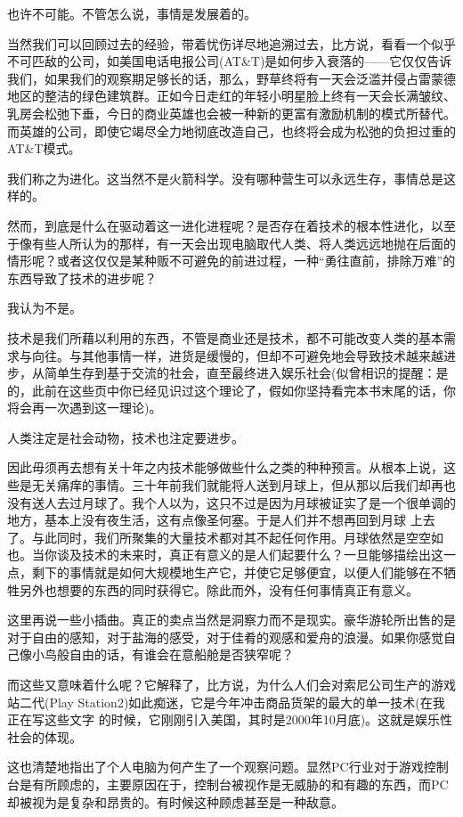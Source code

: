 也许不可能。不管怎么说，事情是发展着的。

当然我们可以回顾过去的经验，带着忧伤详尽地追溯过去，比方说，看看一个似乎不可匹敌的公司，如美国电话电报公司(AT\&T)是如何步入衰落的——它仅仅告诉我们，如果我们的观察期足够长的话，那么，野草终将有一天会泛滥并侵占雷蒙德地区的整洁的绿色建筑群。正如今日走红的年轻小明星脸上终有一天会长满皱纹、乳房会松弛下垂，今日的商业英雄也会被一种新的更富有激励机制的模式所替代。而英雄的公司，即使它竭尽全力地彻底改造自己，也终将会成为松弛的负担过重的AT\&T模式。

我们称之为进化。这当然不是火箭科学。没有哪种营生可以永远生存，事情总是这样的。

然而，到底是什么在驱动着这一进化进程呢？是否存在着技术的根本性进化，以至于像有些人所认为的那样，有一天会出现电脑取代人类、将人类远远地抛在后面的情形呢？或者这仅仅是某种贩不可避免的前进过程，一种“勇往直前，排除万难”的东西导致了技术的进步呢？

我认为不是。

技术是我们所藉以利用的东西，不管是商业还是技术，都不可能改变人类的基本需求与向往。与其他事情一样，进货是缓慢的，但却不可避免地会导致技术越来越进步，从简单生存到基于交流的社会，直至最终进入娱乐社会(似曾相识的提醒：是的，此前在这些页中你已经见识过这个理论了，假如你坚持看完本书末尾的话，你将会再一次遇到这一理论)。

人类注定是社会动物，技术也注定要进步。

因此毋须再去想有关十年之内技术能够做些什么之类的种种预言。从根本上说，这些是无关痛痒的事情。三十年前我们就能将人送到月球上，但从那以后我们却再也没有送人去过月球了。我个人以为，这只不过是因为月球被证实了是一个很单调的地方，基本上没有夜生活，这有点像圣何塞。于是人们并不想再回到月球 上去了。与此同时，我们所聚集的大量技术都对其不起任何作用。月球依然是空空如也。当你谈及技术的未来时，真正有意义的是人们起要什么？一旦能够描绘出这一点，剩下的事情就是如何大规模地生产它，并使它足够便宜，以便人们能够在不牺牲另外也想要的东西的同时获得它。除此而外，没有任何事情真正有意义。

这里再说一些小插曲。真正的卖点当然是洞察力而不是现实。豪华游轮所出售的是对于自由的感知，对于盐海的感受，对于佳肴的观感和爱舟的浪漫。如果你感觉自己像小鸟般自由的话，有谁会在意船舱是否狭窄呢？

而这些又意味着什么呢？它解释了，比方说，为什么人们会对索尼公司生产的游戏站二代(Play Station2)如此痴迷，它是今年冲击商品货架的最大的单一技术(在我正在写这些文字 的时候，它刚刚引入美国，其时是2000年10月底)。这就是娱乐性社会的体现。

这也清楚地指出了个人电脑为何产生了一个观察问题。显然PC行业对于游戏控制台是有所顾虑的，主要原因在于，控制台被视作是无威胁的和有趣的东西，而PC却被视为是复杂和昂贵的。有时候这种顾虑甚至是一种敌意。

